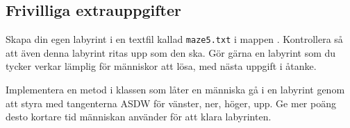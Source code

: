 \subsection{Frivilliga extrauppgifter}

\Task Skapa din egen labyrint i en textfil kallad \texttt{maze5.txt} i mappen . Kontrollera så att även denna labyrint ritas upp som den ska. Gör gärna en labyrint som du tycker verkar lämplig för människor att lösa, med nästa uppgift i åtanke.


\Task Implementera en metod  i klassen  som låter en människa gå i en labyrint genom att styra  med tangenterna ASDW för vänster, ner, höger, upp. Ge mer poäng desto kortare tid människan använder för att klara labyrinten.

